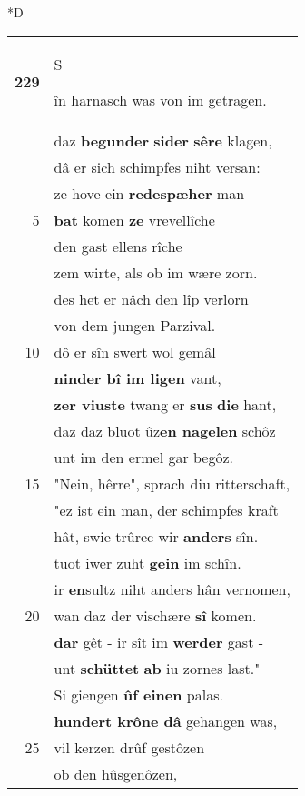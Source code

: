 \documentclass[8pt,a4paper,notitlepage]{article}
\begin{document}
\begin{table}[ht]
\begin{minipage}[t]{0.5\linewidth}
\small
\begin{center}*D
\end{center}
\begin{tabular}{rl}
\textbf{229} & \begin{large}S\end{large}în harnasch was von im getragen.\\ 
 & daz \textbf{begunder} \textbf{sider} \textbf{sêre} klagen,\\ 
 & dâ er sich schimpfes niht versan:\\ 
 & ze hove ein \textbf{redespæher} man\\ 
5 & \textbf{bat} komen \textbf{ze} vrevellîche\\ 
 & den gast ellens rîche\\ 
 & zem wirte, als ob im wære zorn.\\ 
 & des het er nâch den lîp verlorn\\ 
 & von dem jungen Parzival.\\ 
10 & dô er sîn swert wol gemâl\\ 
 & \textbf{ninder bî im ligen} vant,\\ 
 & \textbf{zer viuste} twang er \textbf{sus} \textbf{die} hant,\\ 
 & daz daz bluot ûz\textbf{en nagelen} schôz\\ 
 & unt im den ermel gar begôz.\\ 
15 & "Nein, hêrre", sprach diu ritterschaft,\\ 
 & "ez ist ein man, der schimpfes kraft\\ 
 & hât, swie trûrec wir \textbf{anders} sîn.\\ 
 & tuot iwer zuht \textbf{gein} im schîn.\\ 
 & ir \textbf{en}sultz niht anders hân vernomen,\\ 
20 & wan daz der vischære \textbf{sî} komen.\\ 
 & \textbf{dar} gêt - ir sît im \textbf{werder} gast -\\ 
 & unt \textbf{schüttet} \textbf{ab} iu zornes last."\\ 
 & Si giengen \textbf{ûf einen} palas.\\ 
 & \textbf{hundert krône dâ} gehangen was,\\ 
25 & vil kerzen drûf gestôzen\\ 
 & ob den hûsgenôzen,\\ 

\end{tabular}
\end{minipage}
\end{table}
\end{document}
